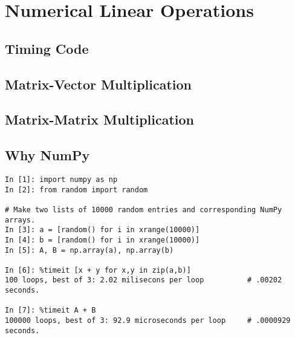 
\section*{Numerical Linear Operations} %

\subsection*{Timing Code} %

\subsection*{Matrix-Vector Multiplication} %

\subsection*{Matrix-Matrix Multiplication} %

\subsection*{Why NumPy} %


\begin{lstlisting}
In [1]: import numpy as np
In [2]: from random import random

# Make two lists of 10000 random entries and corresponding NumPy arrays.
In [3]: a = [random() for i in xrange(10000)]
In [4]: b = [random() for i in xrange(10000)]
In [5]: A, B = np.array(a), np.array(b)

In [6]: %timeit [x + y for x,y in zip(a,b)]
100 loops, best of 3: 2.02 milisecons per loop          # .00202 seconds.

In [7]: %timeit A + B
100000 loops, best of 3: 92.9 microseconds per loop     # .0000929 seconds.
\end{lstlisting}

